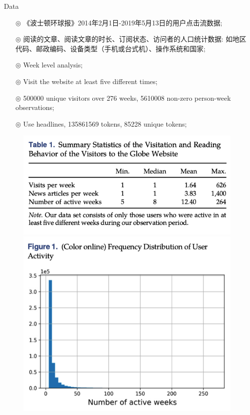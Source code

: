 \documentclass{beamer}
\begin{document}
\begin{frame}[allowframebreaks]{Data}
	\begin{itemize}
		\item[$\circledcirc$] 《波士顿环球报》2014年2月1日-2019年5月13日的用户点击流数据;
		\item[$\circledcirc$] 阅读的文章、阅读文章的时长、订阅状态、访问者的人口统计数据: 如地区代码、邮政编码、设备类型（手机或台式机）、操作系统和国家;
		\item[$\circledcirc$] Week level analysis;
		\item[$\circledcirc$] Visit the website at least ﬁve different times;
		\item[$\circledcirc$] 500000 unique visitors over 276 weeks, 5610008 non-zero person-week observations;
		\item[$\circledcirc$] Use headlines, 135861569 tokens, 85228 unique tokens;
	\end{itemize}
	\begin{figure}[htpb]
		\centering
		\begin{minipage}[t]{0.45\textwidth}
			\centering
			\includegraphics[width=\textwidth]{pic/behavior-data.png}
		\end{minipage}
		\begin{minipage}[t]{0.45\textwidth}
			\centering
			\includegraphics[width=\textwidth]{pic/freq-week.png}
		\end{minipage}
	\end{figure}


\end{frame}
\end{document}
